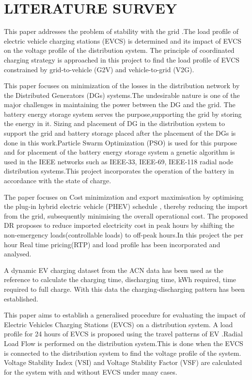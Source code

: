 \chapter{LITERATURE SURVEY}
	\label{chap:LR}
	
	\cite{base} This paper addresses the problem of stability with the grid .The load profile of electric vehicle charging stations (EVCS) is determined  and its impact of EVCS on the voltage profile of the distribution system. The principle of coordinated charging strategy is approached in this project to find the load profile of EVCS constrained by grid-to-vehicle (G2V) and vehicle-to-grid (V2G). 
	
	\noindent \cite{soc} This paper focuses on minimization of the losses in the distribution network by  the Distributed Generators (DGs) systems.The undesirable nature is one of the major challenges in maintaining the power between the DG and the grid. The battery energy storage system serves the purpose,supporting the grid by storing the energy in it. Sizing and placement of DG in the distribution system to support the grid and  battery storage placed after the placement of the DGs is done in this work.Particle Swarm Optimization (PSO) is used for this purpose and for placement of the battery energy storage system a genetic algorithm is used in the IEEE networks such as IEEE-33, IEEE-69, IEEE-118 radial node distribution systems.This project incorporates  the operation of the battery in accordance with the state of charge. 
	
	\noindent \cite{rtp} The paper focuses on Cost minimization and export maximisation  by optimising  the plug-in hybrid electric vehicle (PHEV) schedule , thereby reducing the import from the grid, subsequently minimising the overall operational cost. The proposed DR proposes to  reduce imported electricity cost in peak hours by shifting the non-emergency loads(controllable loads) to off-peak hours.In this project the per hour Real time pricing(RTP) and load profile has been incorporated and analysed.
	
	\noindent \cite{evdata} A dynamic EV charging dataset from the ACN data has been used as the reference to calculate the charging time, discharging time, kWh required, time required to full charge. With this data the charging-discharging pattern has been established. 
	
	\noindent \cite{33bus} This paper aims to establish a generalised procedure for evaluating the impact of Electric Vehicles Charging Stations (EVCS) on a distribution system. A load profile for 24 hours of EVCS is proposed using the travel patterns of EV .Radial Load Flow is performed on the distribution system.This is done when the EVCS is connected to the distribution system to find the voltage profile of the system. Voltage Stability Index (VSI) and Voltage Stability Factor (VSF) are calculated for the system with and without EVCS under many cases.
	
